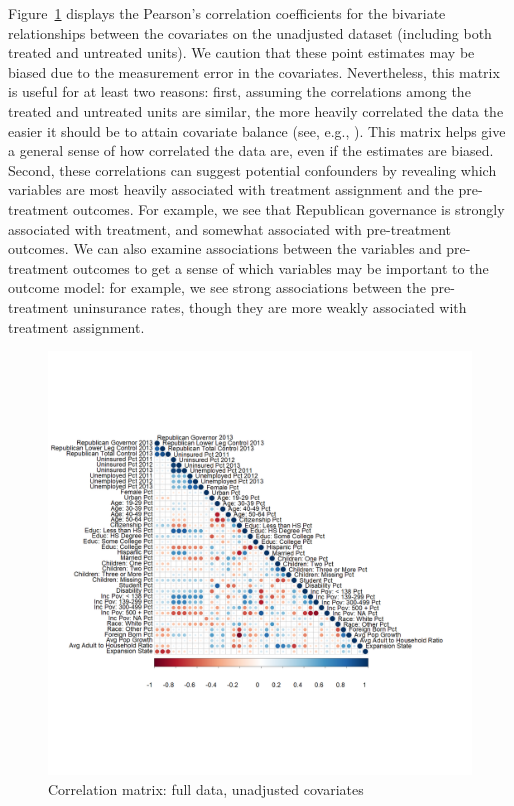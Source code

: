 Figure~\ref{fig:corrmatrix} displays the Pearson's correlation coefficients for the bivariate relationships between the covariates on the unadjusted dataset (including both treated and untreated units). We caution that these point estimates may be biased due to the measurement error in the covariates. Nevertheless, this matrix is useful for at least two reasons: first, assuming the correlations among the treated and untreated units are similar, the more heavily correlated the data the easier it should be to attain covariate balance (see, e.g., \cite{d2021overlap}). This matrix helps give a general sense of how correlated the data are, even if the estimates are biased. Second, these correlations can suggest potential confounders by revealing which variables are most heavily associated with treatment assignment and the pre-treatment outcomes. For example, we see that Republican governance is strongly associated with treatment, and somewhat associated with pre-treatment outcomes. We can also examine associations between the variables and pre-treatment outcomes to get a sense of which variables may be important to the outcome model: for example, we see strong associations between the pre-treatment uninsurance rates, though they are more weakly associated with treatment assignment. 

\begin{figure}[h!]
\begin{center}
    \caption{Correlation matrix: full data, unadjusted covariates}
    \label{fig:corrmatrix}
    \includegraphics[scale=0.25]{01_Plots/correlation-plot-c1-sigma-zero.png}
\end{center}
\end{figure}

\clearpage